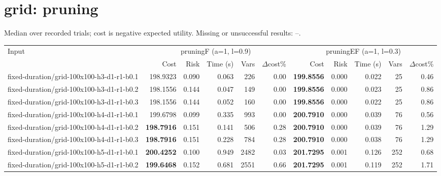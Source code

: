 \documentclass[10pt]{article}
\begin{document}
\section*{grid: pruning}
\noindent Median over recorded trials; cost is negative expected utility. Missing or unsuccessful results: --.\par
\small\begin{tabular}{p{65mm}rrrrrrrrrr}
\toprule
Input & \multicolumn{5}{c}{pruningF (a=1, l=0.9)} & \multicolumn{5}{c}{pruningEF (a=1, l=0.3)} \\
 & Cost & Risk & Time (s) & Vars & $\Delta$cost\% & Cost & Risk & Time (s) & Vars & $\Delta$cost\% \\
\midrule
fixed-\allowbreak duration/\allowbreak grid-\allowbreak 100x100-\allowbreak h3-\allowbreak d1-\allowbreak r1-\allowbreak b0.1 & 198.9323 & 0.090 & 0.063 & 226 & 0.00 & \textbf{199.8556} & 0.000 & 0.022 & 25 & 0.46 \\
fixed-\allowbreak duration/\allowbreak grid-\allowbreak 100x100-\allowbreak h3-\allowbreak d1-\allowbreak r1-\allowbreak b0.2 & 198.1556 & 0.144 & 0.047 & 149 & 0.00 & \textbf{199.8556} & 0.000 & 0.023 & 25 & 0.86 \\
fixed-\allowbreak duration/\allowbreak grid-\allowbreak 100x100-\allowbreak h3-\allowbreak d1-\allowbreak r1-\allowbreak b0.3 & 198.1556 & 0.144 & 0.052 & 160 & 0.00 & \textbf{199.8556} & 0.000 & 0.022 & 25 & 0.86 \\
fixed-\allowbreak duration/\allowbreak grid-\allowbreak 100x100-\allowbreak h4-\allowbreak d1-\allowbreak r1-\allowbreak b0.1 & 199.6798 & 0.099 & 0.335 & 993 & 0.00 & \textbf{200.7910} & 0.000 & 0.039 & 76 & 0.56 \\
fixed-\allowbreak duration/\allowbreak grid-\allowbreak 100x100-\allowbreak h4-\allowbreak d1-\allowbreak r1-\allowbreak b0.2 & \textbf{198.7916} & 0.151 & 0.141 & 506 & 0.28 & \textbf{200.7910} & 0.000 & 0.039 & 76 & 1.29 \\
fixed-\allowbreak duration/\allowbreak grid-\allowbreak 100x100-\allowbreak h4-\allowbreak d1-\allowbreak r1-\allowbreak b0.3 & \textbf{198.7916} & 0.151 & 0.228 & 784 & 0.28 & \textbf{200.7910} & 0.000 & 0.038 & 76 & 1.29 \\
fixed-\allowbreak duration/\allowbreak grid-\allowbreak 100x100-\allowbreak h5-\allowbreak d1-\allowbreak r1-\allowbreak b0.1 & \textbf{200.4252} & 0.100 & 0.949 & 2482 & 0.03 & \textbf{201.7295} & 0.001 & 0.126 & 252 & 0.68 \\
fixed-\allowbreak duration/\allowbreak grid-\allowbreak 100x100-\allowbreak h5-\allowbreak d1-\allowbreak r1-\allowbreak b0.2 & \textbf{199.6468} & 0.152 & 0.681 & 2551 & 0.66 & \textbf{201.7295} & 0.001 & 0.119 & 252 & 1.71 \\

\end{tabular}
\end{document}
